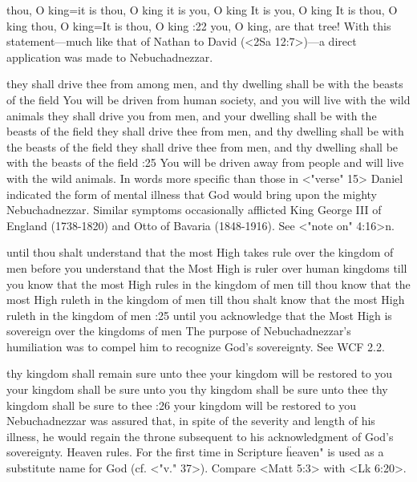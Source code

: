     {thou, O king}={it is thou, O king} %
    {it is you, O king} %
    {It is you, O king} %
    {It is thou, O king} %
    {thou, O king}={It is thou, O king} %
:22 {you, O king, are that tree!} With this statement—much like  that of Nathan to David (<2Sa 12:7>)—a
direct application was made to Nebuchadnezzar.


    {they shall drive thee from among men, and thy dwelling shall be with the beasts of the field} %
    {You will be driven from human society, and you will live with the wild animals} %
    {they shall drive you from men, and your dwelling shall be with the beasts of the field} %
    {they shall drive thee from men, and thy dwelling shall be with the beasts of the field} %
    {they shall drive thee from men, and thy dwelling shall be with the beasts of the field} %
:25 {You will be driven away from people and will live with 
the wild animals.} In words more specific than those in <"verse" 15> 
Daniel indicated the form of mental illness that God would bring 
upon the mighty Nebuchadnezzar. Similar symptoms occasionally 
afflicted King George III of England (1738-1820) and Otto of 
Bavaria (1848-1916). See <"note on" 4:16>n.


    {until thou shalt understand that the most High takes rule over the kingdom of men} %
    {before you understand that the Most High is ruler over human kingdoms} %
    {till you know that the most High rules in the kingdom of men} %
    {till thou know that the most High ruleth in the kingdom of men} %
    {till thou shalt know that the most High ruleth in the kingdom of men} %
:25 {until you acknowledge that the Most High is sovereign over the kingdoms of men}
The purpose of Nebuchadnezzar's humiliation was to compel him 
to recognize God's sovereignty. See WCF 2.2.

    {thy kingdom shall remain sure unto thee} %
    { your kingdom will be restored to you} %
    {your kingdom shall be sure unto you} %
    {thy kingdom shall be sure unto thee} %
    {thy kingdom shall be sure to thee} %
:26 {your kingdom will be restored to you} Nebuchadnezzar 
was assured that, in spite of the severity and length of his illness, 
he would regain the throne subsequent to his acknowledgment of 
God's sovereignty. Heaven rules. For the first time in Scripture 
 \"heaven" is used as a substitute name for God (cf. <"v." 37>). Compare 
<Matt 5:3> with <Lk 6:20>.

